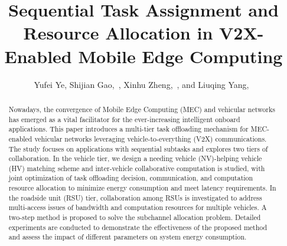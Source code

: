 \documentclass[lettersize,journal]{IEEEtran}
\begin{document}
\title{Sequential Task Assignment and Resource Allocation in V2X-Enabled Mobile Edge Computing}

\author{Yufei Ye, Shijian Gao,~, Xinhu Zheng,~, and Liuqing Yang,~
}



\maketitle


\begin{abstract}
Nowadays, the convergence of Mobile Edge Computing (MEC) and vehicular networks has emerged as a vital facilitator for the ever-increasing intelligent onboard applications. This paper introduces a multi-tier task offloading mechanism for MEC-enabled vehicular networks leveraging vehicle-to-everything (V2X) communications. The study focuses on applications with sequential subtasks and explores two tiers of collaboration. In the vehicle tier, we design a needing vehicle (NV)-helping vehicle (HV) matching scheme and inter-vehicle collaborative computation is studied, with joint optimization of task offloading decision, communication, and computation resource allocation to minimize energy consumption and meet latency requirements. In the roadside unit (RSU) tier, collaboration among RSUs is investigated to address multi-access issues of bandwidth and computation resources for multiple vehicles. A two-step method is proposed to solve the subchannel allocation problem. Detailed experiments are conducted to demonstrate the effectiveness of the proposed method and assess the impact of different parameters on system energy consumption.
\end{abstract}
\end{document}
